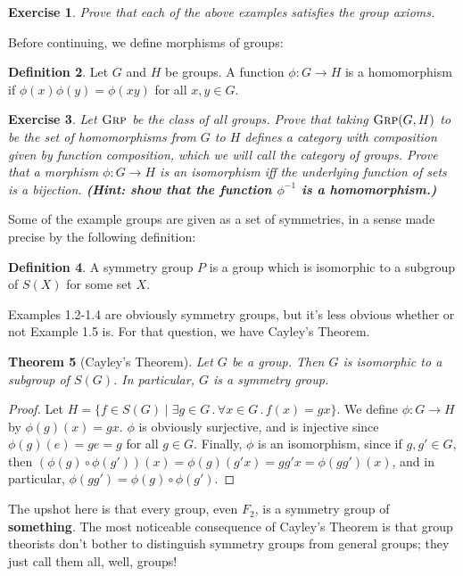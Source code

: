 \documentclass[11pt]{article}
\theoremstyle{plain}
\newtheorem{thm}{Theorem}[section]
\newtheorem{exrc}[thm]{Exercise}
\theoremstyle{definition}
\newtheorem{defn}[thm]{Definition}
\newcommand{\Grp}{{\textsc{Grp}}}
\begin{document}
\begin{exrc}
    Prove that each of the above examples satisfies the group axioms.
\end{exrc}

Before continuing, we define morphisms of groups:

\begin{defn}
    Let $G$ and $H$ be groups. A function $\phi : G \to H$ is a homomorphism if $\phi(x)\phi(y) = \phi(xy)$ for all $x,y \in G$.
\end{defn}

\begin{exrc}
    Let $\Grp$ be the class of all groups. Prove that taking $\Grp(G,H)$ to be the set of homomorphisms from $G$ to $H$ defines a category with composition given by function composition, which we will call the category of groups. Prove that a morphism $\phi : G \to H$ is an isomorphism iff the underlying function of sets is a bijection. \textbf{(Hint: show that the function $\phi^{-1}$ is a homomorphism.)}
\end{exrc}

Some of the example groups are given as a set of symmetries, in a sense made precise by the following definition:

\begin{defn}
    A symmetry group $P$ is a group which is isomorphic to a subgroup of $S(X)$ for some set $X$.
\end{defn}

Examples 1.2-1.4 are obviously symmetry groups, but it's less obvious whether or not Example 1.5 is. For that question, we have Cayley's Theorem.

\begin{thm}[Cayley's Theorem]
    Let $G$ be a group. Then $G$ is isomorphic to a subgroup of $S(G)$. In particular, $G$ is a symmetry group.
\end{thm}
\begin{proof}
    Let $H = \{f \in S(G) \mid \exists g \in G \, . \, \forall x \in G \,.\, f(x) = gx\}$. We define $\phi : G \to H$ by $\phi(g)(x) = gx$. $\phi$ is obviously surjective, and is injective since $\phi(g)(e) = ge = g$ for all $g \in G$. Finally, $\phi$ is an isomorphism, since if $g,g' \in G$, then $(\phi(g) \circ \phi(g'))(x) = \phi(g)(g'x) = gg'x = \phi(gg')(x)$, and in particular, $\phi(gg') = \phi(g) \circ \phi(g')$.
\end{proof}

The upshot here is that every group, even $F_2$, is a symmetry group of \textbf{something}. The most noticeable consequence of Cayley's Theorem is that group theorists don't bother to distinguish symmetry groups from general groups; they just call them all, well, groups!
\end{document}
